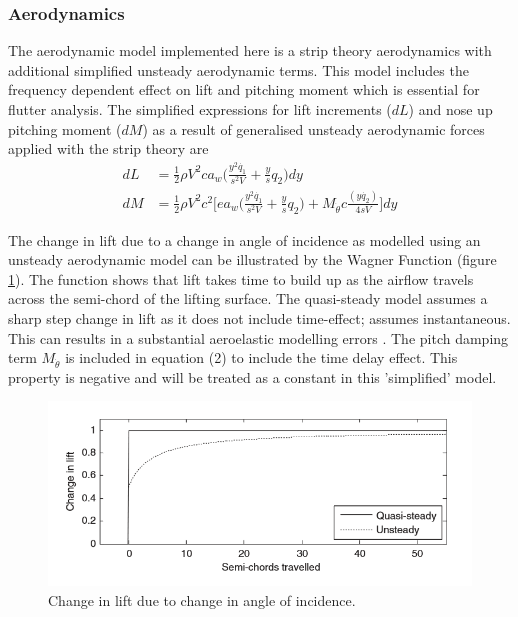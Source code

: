 \documentclass[11pt]{article}
\begin{document}
\subsubsection{Aerodynamics}
The aerodynamic model implemented here is a strip theory aerodynamics with additional simplified unsteady aerodynamic terms. This model includes the frequency dependent effect on lift and pitching moment which is essential for flutter analysis. The simplified expressions for lift increments ($dL$) and nose up pitching moment ($dM$) as a result of generalised unsteady aerodynamic forces applied with the strip theory are 
\begin{align}
dL &= \frac{1}{2}\rho V^2ca_w\Big( \frac{y^2\dot{q_1}}{s^2V}+\frac{y}{s}q_2\Big)dy\\
dM &= \frac{1}{2}\rho V^2 c^2\Big[ea_w\Big(\frac{y^2\dot{q_1}}{s^2V}+\frac{y}{s}q_2\Big)+M_{\dot{\theta}}c\frac{(y\dot{q_2})}{4sV}\Big]dy
\end{align}

The change in lift due to a change in angle of incidence as modelled using an unsteady aerodynamic model can be illustrated by the Wagner Function (figure \ref{fig:wagner}). The function shows that lift takes time to build up as the  airflow travels across the semi-chord of the lifting surface. The quasi-steady model assumes a sharp step change in lift as it does not include time-effect; assumes instantaneous. This can results in a substantial aeroelastic modelling errors \cite{Wright2015INTRODUCTIONLOADS}. The pitch damping term $M_{\dot{\theta}}$ is included in equation (2) to include the time delay effect. This property is negative and will be treated as a constant in this 'simplified' model.

\begin{figure}[H]
    \centering
    \includegraphics[width = .7\textwidth]{figures/wagner.png}
    \caption{Change in lift due to change in angle of incidence.}
    \label{fig:wagner}
\end{figure}
\end{document}
